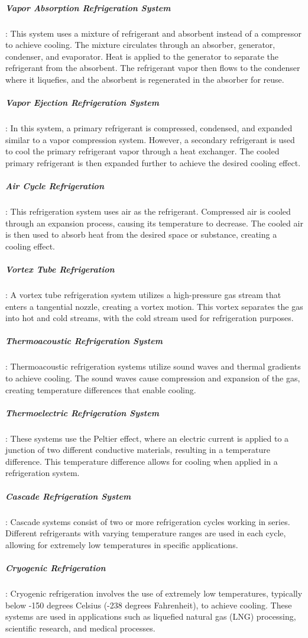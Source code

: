 \documentclass{article}
\begin{document}
\subparagraph{Vapor Absorption Refrigeration System}: This system uses a mixture of refrigerant and absorbent instead of a compressor to achieve cooling. The mixture circulates through an absorber, generator, condenser, and evaporator. Heat is applied to the generator to separate the refrigerant from the absorbent. The refrigerant vapor then flows to the condenser where it liquefies, and the absorbent is regenerated in the absorber for reuse.

\subparagraph{Vapor Ejection Refrigeration System}: In this system, a primary refrigerant is compressed, condensed, and expanded similar to a vapor compression system. However, a secondary refrigerant is used to cool the primary refrigerant vapor through a heat exchanger. The cooled primary refrigerant is then expanded further to achieve the desired cooling effect.

\subparagraph{Air Cycle Refrigeration}: This refrigeration system uses air as the refrigerant. Compressed air is cooled through an expansion process, causing its temperature to decrease. The cooled air is then used to absorb heat from the desired space or substance, creating a cooling effect.

\subparagraph{Vortex Tube Refrigeration}: A vortex tube refrigeration system utilizes a high-pressure gas stream that enters a tangential nozzle, creating a vortex motion. This vortex separates the gas into hot and cold streams, with the cold stream used for refrigeration purposes.

\subparagraph{Thermoacoustic Refrigeration System}: Thermoacoustic refrigeration systems utilize sound waves and thermal gradients to achieve cooling. The sound waves cause compression and expansion of the gas, creating temperature differences that enable cooling.

\subparagraph{Thermoelectric Refrigeration System}: These systems use the Peltier effect, where an electric current is applied to a junction of two different conductive materials, resulting in a temperature difference. This temperature difference allows for cooling when applied in a refrigeration system.

\subparagraph{Cascade Refrigeration System}: Cascade systems consist of two or more refrigeration cycles working in series. Different refrigerants with varying temperature ranges are used in each cycle, allowing for extremely low temperatures in specific applications.

\subparagraph{Cryogenic Refrigeration}: Cryogenic refrigeration involves the use of extremely low temperatures, typically below -150 degrees Celsius (-238 degrees Fahrenheit), to achieve cooling. These systems are used in applications such as liquefied natural gas (LNG) processing, scientific research, and medical processes.
\end{document}
